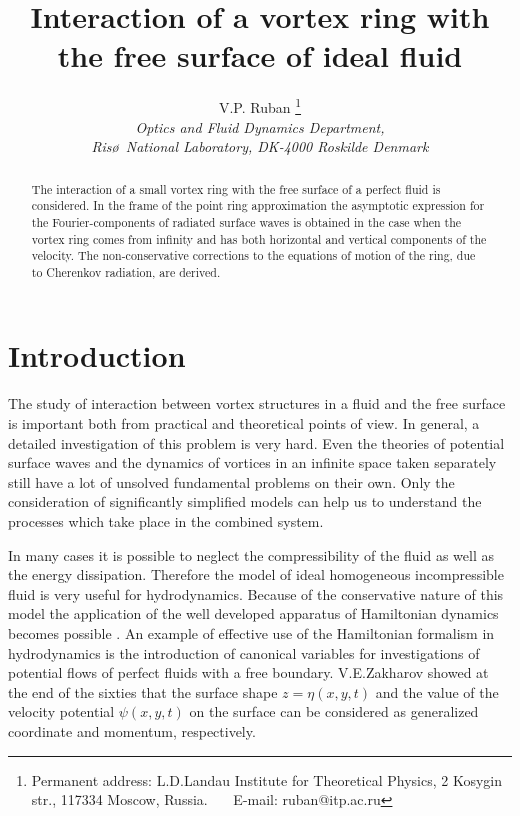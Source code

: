 \oddsidemargin  25pt
\evensidemargin 25pt
\topmargin -25pt
\textwidth 430pt
\textheight 670pt


\title{Interaction of a vortex ring with the free surface of ideal fluid}
\author{V.P. Ruban 
\footnote{Permanent address: L.D.Landau Institute for Theoretical Physics,
 2 Kosygin str., 117334 Moscow, Russia. ~~~E-mail: ruban@itp.ac.ru}\\
 {\it Optics and Fluid Dynamics Department,}\\
 {\it Ris\o ~National Laboratory, DK-4000 Roskilde Denmark}}

\maketitle
\begin{abstract}
The interaction of a small vortex ring with the free surface of a perfect fluid 
is considered. In the frame of the point ring approximation the asymptotic
expression for the Fourier-components of radiated surface waves is obtained
in the case when the vortex ring comes from infinity and has both horizontal 
and vertical components of the velocity. The non-conservative corrections 
to the equations of motion of the ring, due to Cherenkov radiation, are derived.
\end{abstract}

\section{Introduction}

The study of interaction  between vortex structures in a fluid and 
the free surface is important both from practical and theoretical points of 
view. In general, a detailed investigation of this problem is very hard. 
Even the theories of potential surface waves 
and the dynamics of vortices in an infinite space taken 
separately still have a lot of unsolved fundamental problems on their own.
Only the consideration of significantly simplified models can help us 
to understand the processes which take place in the combined system.

In many cases it is possible to neglect the compressibility of the fluid 
as well as the energy dissipation.
Therefore the model of ideal homogeneous incompressible fluid is very
useful for hydrodynamics. Because of the conservative nature of this model 
the application of the well developed apparatus of Hamiltonian dynamics
becomes possible \cite{Arnold} \cite{ZK97}.  
An example of effective use of the Hamiltonian
formalism in hydrodynamics is the introduction of canonical
variables for investigations of potential flows of perfect fluids with a 
free boundary. V.E.Zakharov showed
at the end of the sixties \cite{Z68} that the surface shape $z=\eta(x,y,t)$
and the value of the velocity potential $\psi(x,y,t)$ on the surface can be
considered as generalized coordinate and momentum, respectively.

